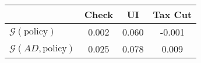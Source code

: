 \begin{tabular}{@{}lccc@{}}
\toprule
                          & Check      & UI    & Tax Cut    \\  \midrule
$\mathcal{G}(\text{policy})$ & 0.002  & 0.060  & -0.001     \\
$\mathcal{G}(AD,\text{policy})$ & 0.025  & 0.078  & 0.009     \\
\end{tabular}
